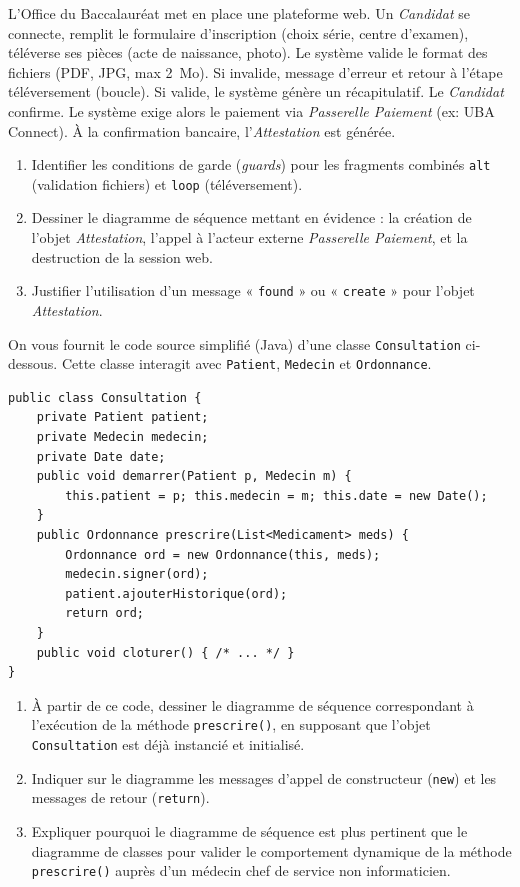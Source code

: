 \documentclass[11pt]{article}
\begin{document}
\begin{exercice}
L'Office du Baccalauréat met en place une plateforme web. Un \textit{Candidat} se connecte, remplit le formulaire d'inscription (choix série, centre d'examen), téléverse ses pièces (acte de naissance, photo). Le système valide le format des fichiers (PDF, JPG, max \SI{2}{Mo}). Si invalide, message d'erreur et retour à l'étape téléversement (boucle). Si valide, le système génère un récapitulatif. Le \textit{Candidat} confirme. Le système exige alors le paiement via \textit{Passerelle Paiement} (ex: UBA Connect). À la confirmation bancaire, l'\textit{Attestation} est générée.
\begin{enumerate}
    \item Identifier les conditions de garde (\textit{guards}) pour les fragments combinés \texttt{alt} (validation fichiers) et \texttt{loop} (téléversement).
    \item Dessiner le diagramme de séquence mettant en évidence : la création de l'objet \textit{Attestation}, l'appel à l'acteur externe \textit{Passerelle Paiement}, et la destruction de la session web.
    \item Justifier l'utilisation d'un message « \texttt{found} » ou « \texttt{create} » pour l'objet \textit{Attestation}.
\end{enumerate}
\end{exercice}

\begin{exercice}
On vous fournit le code source simplifié (Java) d'une classe \texttt{Consultation} ci-dessous. Cette classe interagit avec \texttt{Patient}, \texttt{Medecin} et \texttt{Ordonnance}.

\begin{verbatim}
public class Consultation {
    private Patient patient;
    private Medecin medecin;
    private Date date;
    public void demarrer(Patient p, Medecin m) { 
        this.patient = p; this.medecin = m; this.date = new Date(); 
    }
    public Ordonnance prescrire(List<Medicament> meds) {
        Ordonnance ord = new Ordonnance(this, meds);
        medecin.signer(ord);
        patient.ajouterHistorique(ord);
        return ord;
    }
    public void cloturer() { /* ... */ }
}
\end{verbatim}
\begin{enumerate}
    \item À partir de ce code, dessiner le diagramme de séquence correspondant à l'exécution de la méthode \texttt{prescrire()}, en supposant que l'objet \texttt{Consultation} est déjà instancié et initialisé.
    \item Indiquer sur le diagramme les messages d'appel de constructeur (\texttt{new}) et les messages de retour (\texttt{return}).
    \item Expliquer pourquoi le diagramme de séquence est plus pertinent que le diagramme de classes pour valider le comportement dynamique de la méthode \texttt{prescrire()} auprès d'un médecin chef de service non informaticien.
\end{enumerate}
\end{exercice}
\end{document}
